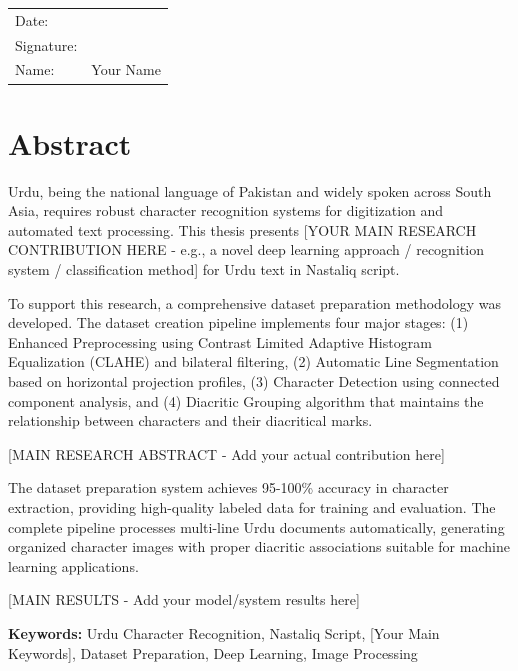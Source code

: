 \documentclass[12pt,a4paper,oneside]{report}
\begin{document}
\vspace{2cm}

\noindent
\begin{tabular}{@{}ll}
Date: & \underline{\hspace{5cm}} \\[1cm]
Signature: & \underline{\hspace{5cm}} \\[0.5cm]
Name: & Your Name \\
\end{tabular}

\chapter*{Abstract}

Urdu, being the national language of Pakistan and widely spoken across South Asia, requires robust character recognition systems for digitization and automated text processing. This thesis presents [YOUR MAIN RESEARCH CONTRIBUTION HERE - e.g., a novel deep learning approach / recognition system / classification method] for Urdu text in Nastaliq script.

To support this research, a comprehensive dataset preparation methodology was developed. The dataset creation pipeline implements four major stages: (1) Enhanced Preprocessing using Contrast Limited Adaptive Histogram Equalization (CLAHE) and bilateral filtering, (2) Automatic Line Segmentation based on horizontal projection profiles, (3) Character Detection using connected component analysis, and (4) Diacritic Grouping algorithm that maintains the relationship between characters and their diacritical marks.

[MAIN RESEARCH ABSTRACT - Add your actual contribution here]

The dataset preparation system achieves 95-100\% accuracy in character extraction, providing high-quality labeled data for training and evaluation. The complete pipeline processes multi-line Urdu documents automatically, generating organized character images with proper diacritic associations suitable for machine learning applications.

[MAIN RESULTS - Add your model/system results here]

\textbf{Keywords:} Urdu Character Recognition, Nastaliq Script, [Your Main Keywords], Dataset Preparation, Deep Learning, Image Processing
\end{document}
